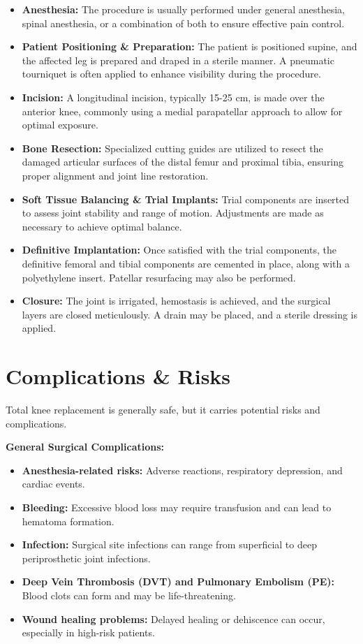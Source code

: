 \begin{itemize}
  \item \textbf{Anesthesia:} The procedure is usually performed under general anesthesia, spinal anesthesia, or a combination of both to ensure effective pain control.
  
  \item \textbf{Patient Positioning \& Preparation:} The patient is positioned supine, and the affected leg is prepared and draped in a sterile manner. A pneumatic tourniquet is often applied to enhance visibility during the procedure.
  
  \item \textbf{Incision:} A longitudinal incision, typically 15-25 cm, is made over the anterior knee, commonly using a medial parapatellar approach to allow for optimal exposure.
  
  \item \textbf{Bone Resection:} Specialized cutting guides are utilized to resect the damaged articular surfaces of the distal femur and proximal tibia, ensuring proper alignment and joint line restoration.
  
  \item \textbf{Soft Tissue Balancing \& Trial Implants:} Trial components are inserted to assess joint stability and range of motion. Adjustments are made as necessary to achieve optimal balance.
  
  \item \textbf{Definitive Implantation:} Once satisfied with the trial components, the definitive femoral and tibial components are cemented in place, along with a polyethylene insert. Patellar resurfacing may also be performed.
  
  \item \textbf{Closure:} The joint is irrigated, hemostasis is achieved, and the surgical layers are closed meticulously. A drain may be placed, and a sterile dressing is applied.
\end{itemize}

\section*{Complications \& Risks}
Total knee replacement is generally safe, but it carries potential risks and complications.

\textbf{General Surgical Complications:}
\begin{itemize}
  \item \textbf{Anesthesia-related risks:} Adverse reactions, respiratory depression, and cardiac events.
  \item \textbf{Bleeding:} Excessive blood loss may require transfusion and can lead to hematoma formation.
  \item \textbf{Infection:} Surgical site infections can range from superficial to deep periprosthetic joint infections.
  \item \textbf{Deep Vein Thrombosis (DVT) and Pulmonary Embolism (PE):} Blood clots can form and may be life-threatening.
  \item \textbf{Wound healing problems:} Delayed healing or dehiscence can occur, especially in high-risk patients.
\end{itemize}

